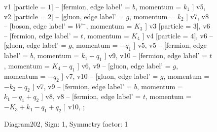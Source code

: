 \documentclass{revtex4}
\begin{document}
\begin{figure}[!htb]
\begin{center}
{    %
v1 [particle = \(1\)] -- [fermion, edge label' = \(b\), momentum = \(k_{1}\) ] v5, 
v2 [particle = \(2\)] -- [gluon, edge label' = \(g\), momentum = \(k_{2}\) ] v7, 
v8 -- [boson, edge label' = \(W^{-}\), momentum = \(K_{3}\) ] v3 [particle = \(3\)], 
v6 -- [fermion, edge label' = \(t\), momentum = \(K_{4}\) ] v4 [particle = \(4\)], 
v6 -- [gluon, edge label' = \(g\), momentum = \(-q_{1}\) ] v5, 
v5 -- [fermion, edge label' = \(b\), momentum = \(k_{1} - q_{1}\) ] v9, 
v10 -- [fermion, edge label' = \(t\), momentum = \(K_{4} - q_{1}\) ] v6, 
v9 -- [gluon, edge label' = \(g\), momentum = \(-q_{2}\) ] v7, 
v10 -- [gluon, edge label' = \(g\), momentum = \(-k_{2} + q_{2}\) ] v7, 
v9 -- [fermion, edge label' = \(b\), momentum = \(k_{1} - q_{1} + q_{2}\) ] v8, 
v8 -- [fermion, edge label' = \(t\), momentum = \(-K_{3} + k_{1} - q_{1} + q_{2}\) ] v10, 
};
\end{center}
\caption{Diagram202, Sign: 1, Symmetry factor: 1}
\end{figure}
\newpage
\end{document}
